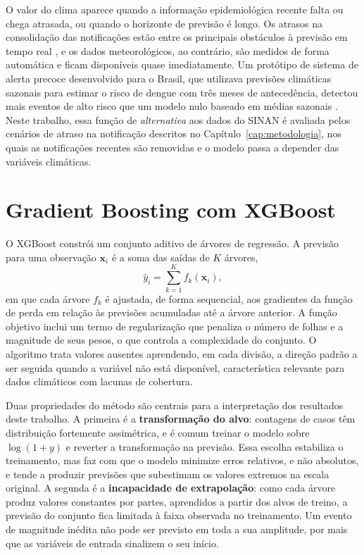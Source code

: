 O valor do clima aparece quando a informação epidemiológica recente falta ou chega atrasada, ou quando o horizonte de previsão é longo. Os atrasos na consolidação das notificações estão entre os principais obstáculos à previsão em tempo real \cite{reich2016challenges}, e os dados meteorológicos, ao contrário, são medidos de forma automática e ficam disponíveis quase imediatamente. Um protótipo de sistema de alerta precoce desenvolvido para o Brasil, que utilizava previsões climáticas sazonais para estimar o risco de dengue com três meses de antecedência, detectou mais eventos de alto risco que um modelo nulo baseado em médias sazonais \cite{lowe2016evaluating}. Neste trabalho, essa função de \textit{alternativa} aos dados do SINAN é avaliada pelos cenários de atraso na notificação descritos no Capítulo~\ref{cap:metodologia}, nos quais as notificações recentes são removidas e o modelo passa a depender das variáveis climáticas.

\section{Gradient Boosting com XGBoost}
\label{sec:xgboost}

O XGBoost \cite{chen2016xgboost} constrói um conjunto aditivo de árvores de regressão. A previsão para uma observação $\mathbf{x}_i$ é a soma das saídas de $K$ árvores,
\begin{equation}
\hat{y}_i = \sum_{k=1}^{K} f_k(\mathbf{x}_i),
\end{equation}
em que cada árvore $f_k$ é ajustada, de forma sequencial, aos gradientes da função de perda em relação às previsões acumuladas até a árvore anterior. A função objetivo inclui um termo de regularização que penaliza o número de folhas e a magnitude de seus pesos, o que controla a complexidade do conjunto. O algoritmo trata valores ausentes aprendendo, em cada divisão, a direção padrão a ser seguida quando a variável não está disponível, característica relevante para dados climáticos com lacunas de cobertura.

Duas propriedades do método são centrais para a interpretação dos resultados deste trabalho. A primeira é a \textbf{transformação do alvo}: contagens de casos têm distribuição fortemente assimétrica, e é comum treinar o modelo sobre $\log(1+y)$ e reverter a transformação na previsão. Essa escolha estabiliza o treinamento, mas faz com que o modelo minimize erros relativos, e não absolutos, e tende a produzir previsões que subestimam os valores extremos na escala original. A segunda é a \textbf{incapacidade de extrapolação}: como cada árvore produz valores constantes por partes, aprendidos a partir dos alvos de treino, a previsão do conjunto fica limitada à faixa observada no treinamento. Um evento de magnitude inédita não pode ser previsto em toda a sua amplitude, por mais que as variáveis de entrada sinalizem o seu início.

